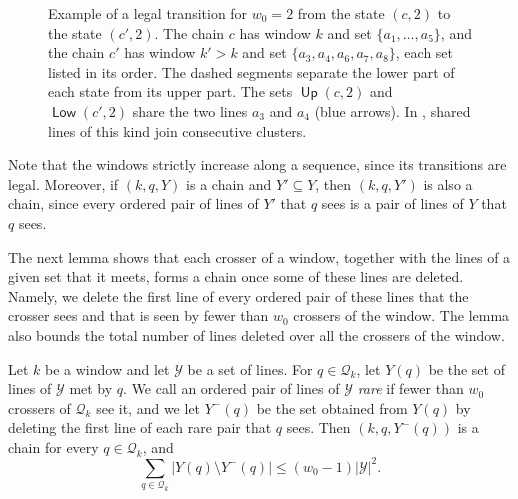 \documentclass[fontsize=12pt,leading=14pt]{fullpaper}
\DeclareMathOperator{\up}{\mathsf{Up}}
\DeclareMathOperator{\dn}{\mathsf{Low}}
\newcommand{\Qcal}{\mathcal{Q}}
\newcommand{\Ycal}{\mathcal{Y}}
\begin{document}
\begin{figure}[ht]
  \centering
  \caption{Example of a legal transition for $w_0=2$ from the state $(c,2)$ to the state $(c',2)$.
    The chain $c$ has window $k$ and set $\{a_1,\dots,a_5\}$, and the chain $c'$ has window $k'>k$ and set $\{a_3,a_4,a_6,a_7,a_8\}$, each set listed in its order.
    The dashed segments separate the lower part of each state from its upper part.
    The sets $\up(c,2)$ and $\dn(c',2)$ share the two lines $a_3$ and $a_4$ (blue arrows).
  In , shared lines of this kind join consecutive clusters.}
  \label{fig:transition}
\end{figure}

Note that the windows strictly increase along a sequence, since its transitions are legal.
Moreover, if $(k,q,Y)$ is a chain and $Y'\subseteq Y$, then $(k,q,Y')$ is also a chain, since every ordered pair of lines of $Y'$ that $q$ sees is a pair of lines of $Y$ that $q$ sees.

The next lemma shows that each crosser of a window, together with the lines of a given set that it meets, forms a chain once some of these lines are deleted.
Namely, we delete the first line of every ordered pair of these lines that the crosser sees and that is seen by fewer than $w_0$ crossers of the window.
The lemma also bounds the total number of lines deleted over all the crossers of the window.

\begin{lemma}\label{lem:prune}
  Let $k$ be a window and let $\Ycal$ be a set of lines.
  For $q\in\Qcal_k$, let $Y(q)$ be the set of lines of $\Ycal$ met by $q$.
  We call an ordered pair of lines of $\Ycal$ \emph{rare} if fewer than $w_0$ crossers of $\Qcal_k$ see it, and we let $Y^-(q)$ be the set obtained from $Y(q)$ by deleting the first line of each rare pair that $q$ sees.
  Then $(k,q,Y^-(q))$ is a chain for every $q\in\Qcal_k$, and
  \[
    \sum_{q\in\Qcal_k}|Y(q)\setminus Y^-(q)|\le(w_0-1)|\Ycal|^2.
  \]
\end{lemma}
\end{document}
